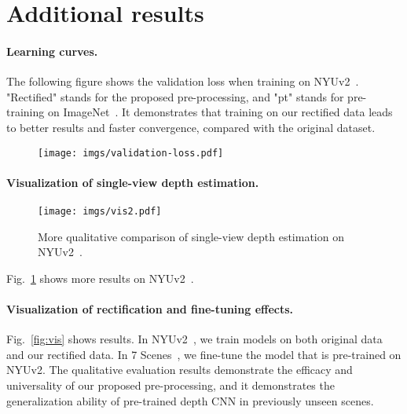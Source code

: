 \documentclass{article}
\newcommand{\figref}[1]{Fig.~\ref{#1}}
\begin{document}
\section{Additional results}

\paragraph{Learning curves.}
The following figure shows the validation loss when training on NYUv2~\cite{silberman2012indoor}.
"Rectified" stands for the proposed pre-processing, and "pt" stands for pre-training on ImageNet~\cite{imagenet_cvpr09}.
It demonstrates that training on our rectified data leads to better results and faster convergence, compared with the original dataset.

\begin{figure}[ht]
\centering
\texttt{[image: imgs/validation-loss.pdf]}
\end{figure}


\paragraph{Visualization of single-view depth estimation.}
\begin{figure}[t]
\centering
\texttt{[image: imgs/vis2.pdf]} \\
\caption{More qualitative comparison of single-view depth estimation on NYUv2~\cite{silberman2012indoor}.}
\label{fig:show_supp}
\vspace{-2mm}
\end{figure}
\figref{fig:show_supp} shows more results on NYUv2~\cite{silberman2012indoor}.



\paragraph{Visualization of rectification and fine-tuning effects.}

\figref{fig:vis} shows results.
In NYUv2~\cite{silberman2012indoor}, we train models on both original data and our rectified data. In 7 Scenes~\cite{shotton2013scene}, we fine-tune the model that is pre-trained on NYUv2.
The qualitative evaluation results demonstrate the efficacy and universality of our proposed pre-processing,
and it demonstrates the generalization ability of pre-trained depth CNN in previously unseen scenes. 
\end{document}
